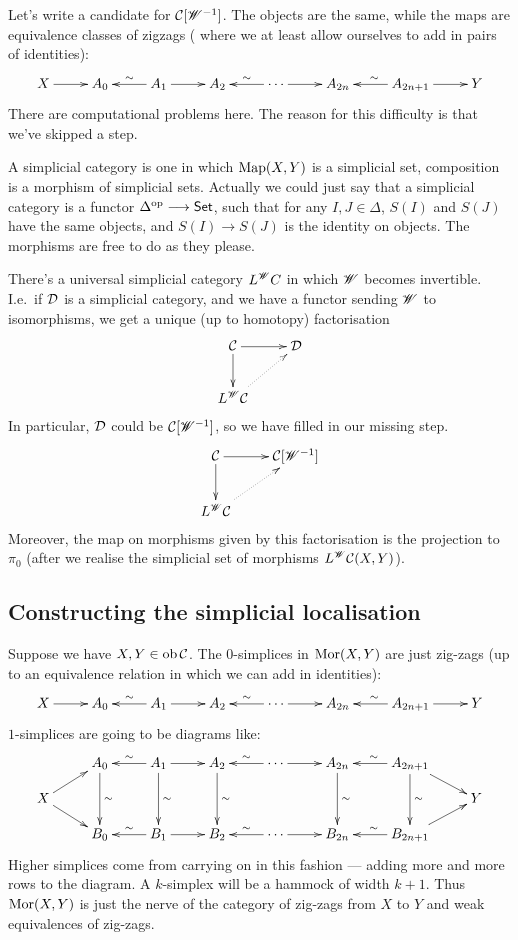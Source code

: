\documentclass[11pt]{article}
\begin{document}
\begin{SaulSimplicialLocalisation}
Let's write a candidate for $\mathcal{C}[\mathscr{W}^{-1}]$. The objects are the same, while the maps are equivalence classes of zigzags ( where we at least allow ourselves to add in pairs of identities):
\[\xymatrix{
X\ar[r]&A_0&\ar[l]_\sim A_1\ar[r]&A_2&\ar[l]_\sim\cdots\ar[r]&A_{2n}&A_{2n+1}\ar[l]_\sim\ar[r]&Y
}\]
There are computational problems here. The reason for this difficulty is that we've skipped a step.
\begin{defn*}
A simplicial category is one in which $\operatorname{Map}(X,Y)$ is a simplicial set, composition is a morphism of simplicial sets. Actually we could just say that a simplicial category is a functor $\Delta^{\textup{op}}\longrightarrow\operatorname{{\mathsf{Set}}}$, such that for any $I,J\in\Delta$, $S(I)$ and $S(J)$ have the same objects, and $S(I)\to S(J)$ is the identity on objects. The morphisms are free to do as they please.
\end{defn*}
There's a universal simplicial category $L^{\mathscr{W}} C$ in which $\mathscr{W}$ becomes invertible. I.e.\ if $\mathcal{D}$ is a simplicial category, and we have a functor sending $\mathscr{W}$ to isomorphisms, we get a unique (up to homotopy) factorisation
\[\xymatrix{
\ar[d]\calC\ar[r]&\calD\\
L^\scrW \calC\ar@{..>}[ur]
}\]
In particular, $\mathcal{D}$ could be $\mathcal{C}[\mathscr{W}^{-1}]$, so we have filled in our missing step.
\[\xymatrix{
\ar[d]\calC\ar[r]&\calC[\scrW^{-1}]\\
L^\scrW \calC\ar@{..>}[ur]
}\]
Moreover, the map on morphisms given by this factorisation is the projection to $\pi_0$ (after we realise the simplicial set of morphisms $L^{\mathscr{W}} \mathcal{C}(X,Y)$).
\subsection*{Constructing the simplicial localisation}
Suppose we have $X,Y\in\textup{ob}\,\mathcal{C}$. The $0$-simplices in $\operatorname{Mor}(X,Y)$ are just zig-zags (up to an equivalence relation in which we can add in identities):
\[\xymatrix{
X\ar[r]&A_0&\ar[l]_\sim A_1\ar[r]&A_2&\ar[l]_\sim\cdots\ar[r]&A_{2n}&A_{2n+1}\ar[l]_\sim\ar[r]&Y
}\]
$1$-simplices are going to be diagrams like:
\[\xymatrix@R=.4cm{
&A_0\ar[dd]^\sim&\ar[l]_\sim A_1\ar[dd]^\sim\ar[r]&A_2\ar[dd]^\sim&\ar[l]_\sim\cdots\ar[r]&A_{2n}\ar[dd]^\sim&A_{2n+1}\ar[dd]^\sim\ar[l]_\sim\ar[rd]\\
X\ar[rd]\ar[ur]&&&&&&&Y\\
&B_0&\ar[l]_\sim B_1\ar[r]&B_2&\ar[l]_\sim\cdots\ar[r]&B_{2n}&B_{2n+1}\ar[l]_\sim\ar[ru]
}\]
Higher simplices come from carrying on in this fashion --- adding more and more rows to the diagram. A $k$-simplex will be a hammock of width $k+1$.
Thus $\operatorname{Mor}(X,Y)$ is just the nerve of the category of zig-zags from $X$ to $Y$ and weak equivalences of zig-zags.


\end{SaulSimplicialLocalisation}
\end{document}
